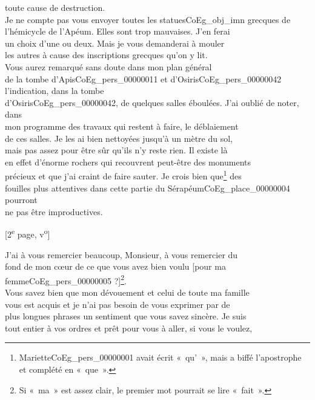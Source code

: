 \documentclass{book}
\begin{document}
toute cause de destruction.\\
\indent Je ne compte pas vous envoyer toutes les statues\gls{CoEg_obj_imn} grecques de\\
l’hémicycle de l’Apéum. Elles sont trop mauvaises. J’en ferai\\
un choix d’une ou deux. Mais je vous demanderai à mouler\\
les autres à cause des inscriptions grecques qu’on y lit.\\
\indent Vous aurez remarqué sans doute dans mon plan général\\
de la tombe d’Apis\gls{CoEg_pers_00000011} et d’Osiris\gls{CoEg_pers_00000042} l’indication, dans la tombe\\
d’Osiris\gls{CoEg_pers_00000042}, de quelques salles éboulées. J’ai oublié de noter, dans\\
mon programme des travaux qui restent à faire, le déblaiement\\
de ces salles. Je les ai bien nettoyées jusqu’à un mètre du sol,\\
mais pas assez pour être sûr qu’ils n’y reste rien. Il existe là\\
en effet d’énorme rochers qui recouvrent peut-être des monuments\\
précieux et que j’ai craint de faire sauter. Je crois bien que\footnote{Mariette\gls{CoEg_pers_00000001} avait écrit «~qu'~», mais a biffé l'apostrophe et complété en «~que~».} des\\
fouilles plus attentives dans cette partie du Sérapéum\gls{CoEg_place_00000004} pourront\\
ne pas être improductives.
{\footnotesize \begin{center} {[2\textsuperscript{e} page, v\textsuperscript{o}]}\end{center}}
\indent J’ai à vous remercier beaucoup, Monsieur, à vous remercier du\\
fond de mon cœur de ce que vous avez bien voulu [pour ma femme\gls{CoEg_pers_00000005} ?]\footnote{Si «~ma~» est assez clair, le premier mot pourrait se lire «~fait~».}.\\
Vous savez bien que mon dévouement et celui de toute ma famille\\
vous est acquis et je n’ai pas besoin de vous exprimer par de\\
plus longues phrases un sentiment que vous savez sincère. Je suis\\
tout entier à vos ordres et prêt pour vous à aller, si vous le voulez,\\
\end{document}
